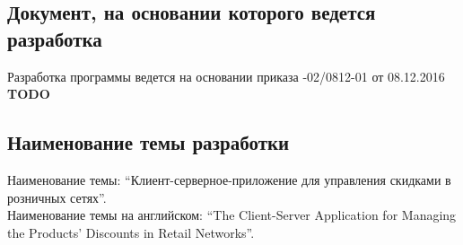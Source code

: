 \subsection{Документ, на основании которого ведется разработка}
Разработка программы ведется на основании приказа 
-02/0812-01 от 08.12.2016
\textbf{TODO}


\subsection{Наименование темы разработки}
Наименование темы: ``Клиент-серверное-приложение для управления скидками в розничных сетях''. \\
Наименование темы на английском: ``The Client-Server Application for Managing the Products' Discounts in Retail Networks''. \\
